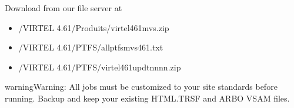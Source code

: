 \documentclass[letterpaper,10pt,english]{sphinxmanual}
\begin{document}
\sphinxAtStartPar
Download from our file server at 
\begin{itemize}
\item {} 
\sphinxAtStartPar
/VIRTEL 4.61/Produits/virtel461mvs.zip

\item {} 
\sphinxAtStartPar
/VIRTEL 4.61/PTFS/allptfs\sphinxhyphen{}mvs461.txt

\item {} 
\sphinxAtStartPar
/VIRTEL 4.61/PTFS/virtel461updtnnnn.zip

\end{itemize}

\begin{sphinxadmonition}{warning}{Warning:}
\sphinxAtStartPar
All jobs must be customized to your site standards before running. Backup and keep your existing HTML.TRSF and ARBO VSAM files.
\end{sphinxadmonition}
\end{document}
